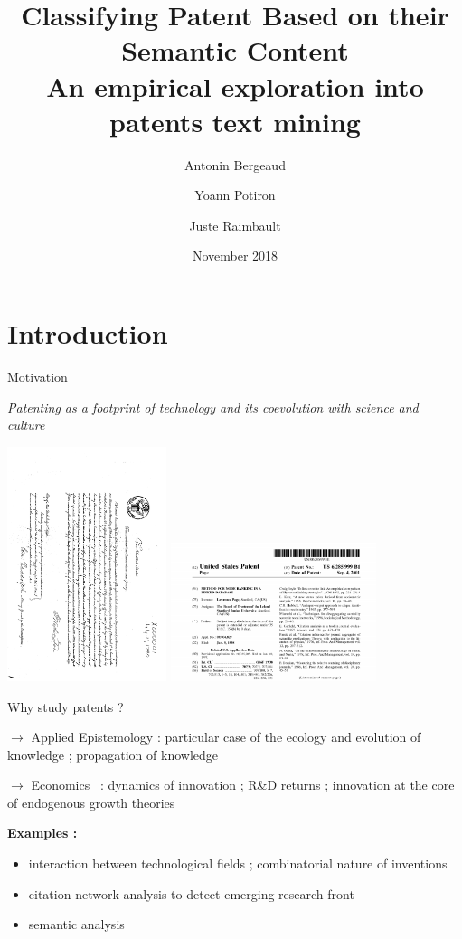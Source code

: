 \documentclass{beamer}
\title[Patent Mining]{Classifying Patent Based on their Semantic Content \\ An empirical exploration into patents text mining}
\author[Bergeaud, Potiron, Raimbault]{Antonin Bergeaud \and Yoann Potiron \and Juste Raimbault}
\institute[]{Banque de France, Keio University and ISC-PIF}
\date{November 2018}
\begin{document}
\begin{frame}
  \titlepage
\end{frame}

\section{Introduction}
\begin{frame}{Motivation}
    
    \textit{Patenting as a footprint of technology and its coevolution with science and culture~\cite{bais2010praise}}

\bigskip
\centering

\includegraphics[width=0.35\textwidth,angle=90]{figures/USX1}
\includegraphics[width=0.45\textwidth]{figures/pageRank}
    
\end{frame}

\begin{frame}{Why study patents ?}
\justify

$\rightarrow$ Applied Epistemology : particular case of the ecology and evolution of knowledge ; propagation of knowledge

$\rightarrow$ Economics~\cite{griliches1998patent} : dynamics of innovation ; R{\&}D returns ; innovation at the core of endogenous growth theories~\cite{aghionhowitt1992}

\bigskip

\textbf{Examples :}

\begin{itemize}
\item \cite{Youn:2015fk} interaction between technological fields ; combinatorial nature of inventions
\item \cite{2016arXiv160207928B} citation network analysis to detect emerging research front
\item \cite{gerken2012new} \cite{tseng2007text} semantic analysis
\end{itemize} 

\end{frame}
\end{document}
